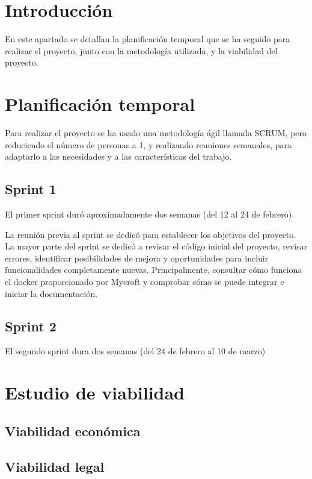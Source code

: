 
\section{Introducción}
En este apartado se detallan la planificación temporal que se ha seguido para realizar el proyecto, junto con la metodología utilizada, y la viabilidad del proyecto.

\section{Planificación temporal}
Para realizar el proyecto se ha usado una metodología ágil llamada SCRUM, pero reduciendo el número de personas a 1, y realizando reuniones semanales, para adaptarlo a las necesidades y a las características del trabajo.

\subsection*{Sprint 1}
El primer sprint duró aproximadamente dos semanas (del 12 al 24 de febrero).

La reunión previa al sprint se dedicó para establecer los objetivos del proyecto.
La mayor parte del sprint se dedicó a revisar el código inicial del proyecto, revisar errores, identificar posibilidades de mejora y oportunidades para incluir funcionalidades completamente nuevas. Principalmente, consultar cómo funciona el docker proporcionado por Mycroft y comprobar cómo se puede integrar e iniciar la documentación.

\subsection*{Sprint 2}
El segundo sprint dura dos semanas (del 24 de febrero al 10 de marzo)


\section{Estudio de viabilidad}

\subsection{Viabilidad económica}

\subsection{Viabilidad legal}


